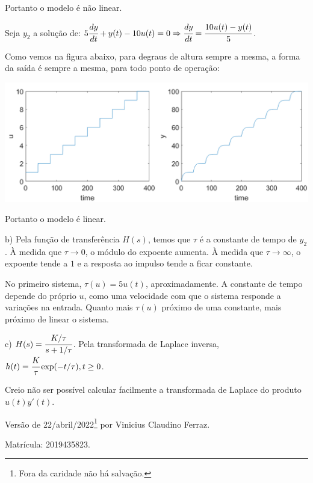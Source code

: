 \documentclass{rbfin}
\begin{document}
Portanto o modelo é não linear.

Seja $y_2$ a solução de: $5 \cfrac{dy}{dt} + y(t) - 10 u(t) = 0 \Rightarrow \cfrac{dy}{dt} = \cfrac{10 u(t) - y(t)}{5}$.

Como vemos na figura abaixo, para degraus de altura sempre a mesma, a forma da saída é sempre a mesma, para todo ponto de operação: 

\begin{center}
\includegraphics[scale=0.65]{q3y2}
\end{center}

Portanto o modelo é linear.

b) Pela função de transferência $H(s)$, temos que $\tau$ é a constante de tempo de $y_2$. À medida que $\tau \to 0$, o módulo do expoente aumenta. À medida que $\tau \to \infty$, o expoente tende a $1$ e a resposta ao impulso tende a ficar constante.

No primeiro sistema, $\tau(u) = 5 u(t)$, aproximadamente. A constante de tempo depende do próprio $u$, como uma velocidade com que o sistema responde a variações na entrada. Quanto mais $\tau(u)$ próximo de uma constante, mais próximo de linear o sistema.

c) $H(s) = \cfrac{K/\tau}{s + 1/\tau}$. Pela transformada de Laplace inversa, $h(t) = \cfrac{K}{\tau} \exp(-t/\tau), t \ge 0$.

Creio não ser possível calcular facilmente a transformada de Laplace do produto $u(t) y'(t)$.

\vspace{6mm}

Versão de 22/abril/2022\footnote{Fora da caridade não há salvação.} por Vinicius Claudino Ferraz. 

Matrícula: 2019435823.
\end{document}

